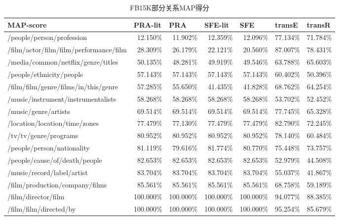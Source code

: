 \begin{table}[htbp]
  \centering
  \caption{FB15K部分关系MAP得分}
    \begin{tabular}{|l|r|r|r|r|r|r|}
    \hline
    MAP-score & \multicolumn{1}{l|}{PRA-lit  } & \multicolumn{1}{l|}{PRA} & \multicolumn{1}{l|}{SFE-lit} & \multicolumn{1}{l|}{SFE} & \multicolumn{1}{l|}{transE} & \multicolumn{1}{l|}{transR} \\
    \hline
    /people/person/profession & 12.150\% & 11.902\% & 12.359\% & 12.096\% & 77.134\% & 71.784\% \\
    \hline
    /film/actor/film/film/performance/film & 28.309\% & 26.179\% & 22.121\% & 20.560\% & 87.007\% & 78.431\% \\
    \hline
    /media/common/netflix/genre/titles & 50.135\% & 48.281\% & 49.919\% & 49.546\% & 63.788\% & 65.603\% \\
    \hline
    /people/ethnicity/people & 57.143\% & 57.143\% & 57.143\% & 57.143\% & 60.402\% & 50.396\% \\
    \hline
    /film/film/genre/films/in/this/genre & 57.285\% & 55.650\% & 41.435\% & 41.828\% & 68.762\% & 64.254\% \\
    \hline
    /music/instrument/instrumentalists & 58.268\% & 58.268\% & 58.268\% & 58.268\% & 53.702\% & 52.452\% \\
    \hline
    /music/genre/artists & 69.514\% & 69.514\% & 69.514\% & 69.514\% & 77.745\% & 65.328\% \\
    \hline
    /location/location/time/zones & 77.479\% & 77.130\% & 77.479\% & 77.479\% & 82.790\% & 72.245\% \\
    \hline
    /tv/tv/genre/programs & 80.952\% & 80.952\% & 80.952\% & 80.952\% & 78.140\% & 60.484\% \\
    \hline
    /people/person/nationality & 81.119\% & 79.616\% & 81.774\% & 80.770\% & 75.448\% & 73.757\% \\
    \hline
    /people/cause/of/death/people & 82.653\% & 82.653\% & 82.653\% & 82.653\% & 52.979\% & 44.508\% \\
    \hline
    /music/record/label/artist & 83.704\% & 83.704\% & 83.704\% & 83.704\% & 55.037\% & 41.867\% \\
    \hline
    /film/production/company/films & 85.561\% & 85.561\% & 85.561\% & 85.561\% & 68.758\% & 59.189\% \\
    \hline
    /film/director/film & 100.000\% & 100.000\% & 100.000\% & 100.000\% & 94.077\% & 88.385\% \\
    \hline
    /film/film/directed/by & 100.000\% & 100.000\% & 100.000\% & 100.000\% & 95.254\% & 85.679\% \\
    \hline
    \end{tabular}%
  \label{tab:addlabel-fb-map}%
\end{table}%


